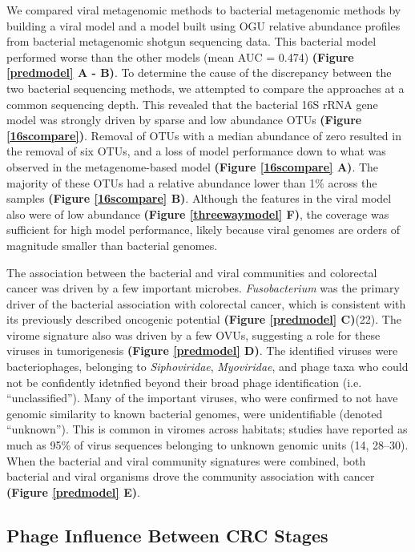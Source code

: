 \documentclass[12pt,]{article}
\begin{document}
We compared viral metagenomic methods to bacterial metagenomic methods
by building a viral model and a model built using OGU relative abundance
profiles from bacterial metagenomic shotgun sequencing data. This
bacterial model performed worse than the other models (mean AUC = 0.474)
\textbf{(Figure \ref{predmodel} A - B)}. To determine the cause of the
discrepancy between the two bacterial sequencing methods, we attempted
to compare the approaches at a common sequencing depth. This revealed
that the bacterial 16S rRNA gene model was strongly driven by sparse and
low abundance OTUs \textbf{(Figure \ref{16scompare})}. Removal of OTUs
with a median abundance of zero resulted in the removal of six OTUs, and
a loss of model performance down to what was observed in the
metagenome-based model \textbf{(Figure \ref{16scompare} A)}. The
majority of these OTUs had a relative abundance lower than 1\% across
the samples \textbf{(Figure \ref{16scompare} B)}. Although the features
in the viral model also were of low abundance \textbf{(Figure
\ref{threewaymodel} F)}, the coverage was sufficient for high model
performance, likely because viral genomes are orders of magnitude
smaller than bacterial genomes.

The association between the bacterial and viral communities and
colorectal cancer was driven by a few important microbes.
\emph{Fusobacterium} was the primary driver of the bacterial association
with colorectal cancer, which is consistent with its previously
described oncogenic potential \textbf{(Figure \ref{predmodel} C)}(22).
The virome signature also was driven by a few OVUs, suggesting a role
for these viruses in tumorigenesis \textbf{(Figure \ref{predmodel} D)}.
The identified viruses were bacteriophages, belonging to
\emph{Siphoviridae}, \emph{Myoviridae}, and phage taxa who could not be
confidently idetnfied beyond their broad phage identification (i.e.
``unclassified''). Many of the important viruses, who were confirmed to
not have genomic similarity to known bacterial genomes, were
unidentifiable (denoted ``unknown''). This is common in viromes across
habitats; studies have reported as much as 95\% of virus sequences
belonging to unknown genomic units (14, 28--30). When the bacterial and
viral community signatures were combined, both bacterial and viral
organisms drove the community association with cancer \textbf{(Figure
\ref{predmodel} E)}.

\subsection{Phage Influence Between CRC
Stages}\label{phage-influence-between-crc-stages}
\end{document}
